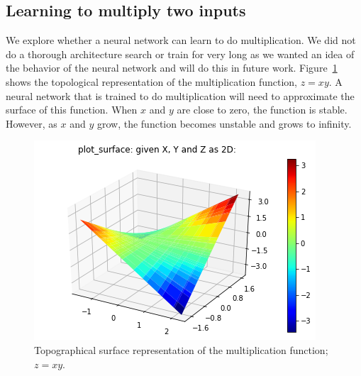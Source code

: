 \subsection{Learning to multiply two inputs}



We explore whether a neural network can learn to do multiplication. We did not do a thorough architecture search or train for very long as we wanted an idea of the behavior of the neural network and will do this in future work. 
Figure~\ref{fig:mult_fx} shows the topological representation of the multiplication function, $z=xy$.  A neural network that is trained to do multiplication will need to approximate the surface of this function.  
When $x$ and $y$ are close to zero, the function is stable.  However, as $x$ and $y$ grow, the function becomes unstable and grows to infinity. 


\begin{figure}
\begin{center}
\includegraphics{figures/equal/Multiplication_Function_plot.png}
\caption{Topographical surface representation of the multiplication function; $z=xy$.}
\label{fig:mult_fx}
\end{center}
\end{figure}

